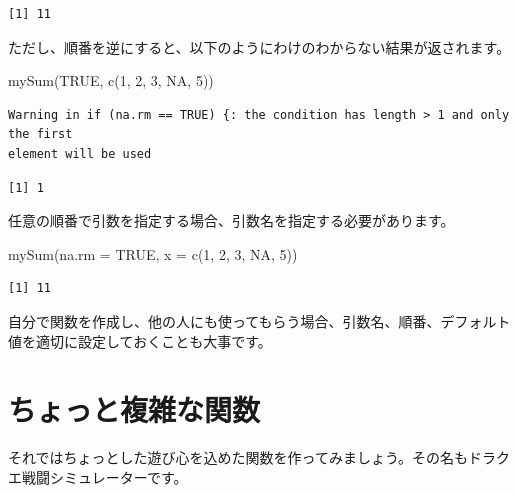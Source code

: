 \documentclass[
  a4paper,
  pandoc,
  ja=standard,
  jafont=haranoaji]{bxjsbook}
\newenvironment{Shaded}{\begin{snugshade}}{\end{snugshade}}
\newcommand{\AttributeTok}[1]{\textcolor[rgb]{0.00,0.48,0.65}{#1}}
\newcommand{\ConstantTok}[1]{\textcolor[rgb]{0.56,0.35,0.01}{#1}}
\newcommand{\DecValTok}[1]{\textcolor[rgb]{0.68,0.00,0.00}{#1}}
\newcommand{\FunctionTok}[1]{\textcolor[rgb]{0.28,0.35,0.67}{#1}}
\newcommand{\NormalTok}[1]{\textcolor[rgb]{0.00,0.48,0.65}{#1}}
\begin{document}
\begin{verbatim}
[1] 11
\end{verbatim}

ただし、順番を逆にすると、以下のようにわけのわからない結果が返されます。

\begin{Shaded}
\begin{Highlighting}[numbers=left,,]
\FunctionTok{mySum}\NormalTok{(}\ConstantTok{TRUE}\NormalTok{, }\FunctionTok{c}\NormalTok{(}\DecValTok{1}\NormalTok{, }\DecValTok{2}\NormalTok{, }\DecValTok{3}\NormalTok{, }\ConstantTok{NA}\NormalTok{, }\DecValTok{5}\NormalTok{))}
\end{Highlighting}
\end{Shaded}

\begin{verbatim}
Warning in if (na.rm == TRUE) {: the condition has length > 1 and only the first
element will be used
\end{verbatim}

\begin{verbatim}
[1] 1
\end{verbatim}

任意の順番で引数を指定する場合、引数名を指定する必要があります。

\begin{Shaded}
\begin{Highlighting}[numbers=left,,]
\FunctionTok{mySum}\NormalTok{(}\AttributeTok{na.rm =} \ConstantTok{TRUE}\NormalTok{, }\AttributeTok{x =} \FunctionTok{c}\NormalTok{(}\DecValTok{1}\NormalTok{, }\DecValTok{2}\NormalTok{, }\DecValTok{3}\NormalTok{, }\ConstantTok{NA}\NormalTok{, }\DecValTok{5}\NormalTok{))}
\end{Highlighting}
\end{Shaded}

\begin{verbatim}
[1] 11
\end{verbatim}

自分で関数を作成し、他の人にも使ってもらう場合、引数名、順番、デフォルト値を適切に設定しておくことも大事です。

\hypertarget{sec-func_adv}{%
\section{ちょっと複雑な関数}\label{sec-func_adv}}

それではちょっとした遊び心を込めた関数を作ってみましょう。その名もドラクエ戦闘シミュレーターです。
\end{document}
